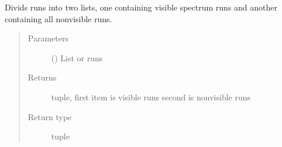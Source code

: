 \documentclass[letterpaper,10pt,english]{sphinxmanual}
\begin{document}
\begin{fulllineitems}
\begin{fulllineitems}
\label{\detokenize{polo.utils:polo.utils.io_utils.PptxWriter.sort_runs_by_spectrum}}
Divids runs into two lists, one containing visible spectrum
runs and another containing all non\sphinxhyphen{}visible runs.
\begin{quote}\begin{description}
\item[{Parameters}] \leavevmode
{} () \textendash{} List or runs

\item[{Returns}] \leavevmode
tuple, first item is visible runs second is non\sphinxhyphen{}visible runs

\item[{Return type}] \leavevmode
tuple

\end{description}\end{quote}

\end{fulllineitems}


\end{fulllineitems}

\end{document}

